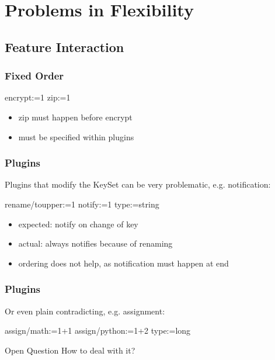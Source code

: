 \section{Problems in Flexibility}

\subsection{Feature Interaction}

\begin{frame}[fragile]
	\frametitle{Fixed Order}

	\begin{code}
	  encrypt:=1
	  zip:=1
	\end{code}

	\begin{itemize}
	\item zip must happen before encrypt
	\item must be specified within plugins
	\end{itemize}
\end{frame}

\begin{frame}[fragile]
	\frametitle{Plugins}

	Plugins that modify the KeySet can be very problematic, e.g. notification:
	\begin{code}
	  rename/toupper:=1
	  notify:=1
	  type:=string
	\end{code}

	\begin{itemize}
	\item expected: notify on change of key
	\item actual: always notifies because of renaming
	\item ordering does not help, as notification must happen at end
	\end{itemize}
\end{frame}

\begin{frame}[fragile]
	\frametitle{Plugins}

	Or even plain contradicting, e.g. assignment:
	\begin{code}
	  assign/math:=1+1
	  assign/python:=1+2
	  type:=long
	\end{code}

	\begin{alertblock}{Open Question}
	How to deal with it?
	\end{alertblock}
\end{frame}


